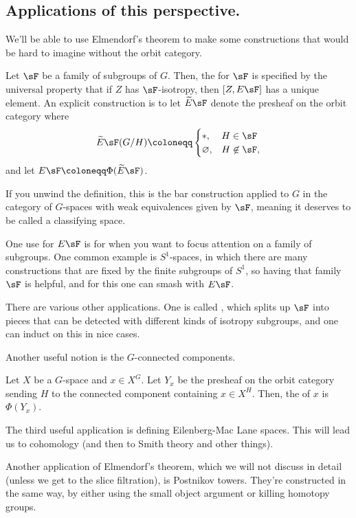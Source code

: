 \subsection*{Applications of this perspective.}
We'll be able to use Elmendorf's theorem to make some constructions that would be hard to imagine without the orbit
category.
\begin{defn}
Let $\sF$ be a family of subgroups of $G$. Then, the  for $\sF$
is specified by the universal property that if $Z$ has $\sF$-isotropy, then $[Z, E\sF]$ has a unique element. An
explicit construction is to let $\widetilde E\sF$ denote the presheaf on the orbit category where
\[\widetilde E\sF(G/H) \coloneqq
\begin{cases}
	*, &H\in\sF\\
	\varnothing, &H\not\in\sF,
\end{cases}\]
and let $E\sF\coloneqq \Phi(\widetilde E\sF)$.
\end{defn}
If you unwind the definition, this is the bar construction applied to $G$ in the category of $G$-spaces with weak
equivalences given by $\sF$, meaning it deserves to be called a classifying space.
\begin{rem}
One use for $E\sF$ is for when you want to focus attention on a family of subgroups. One common example is
$S^1$-spaces, in which there are many constructions that are fixed by the finite subgroups of $S^1$, so having that
family $\sF$ is helpful, and for this one can smash with $E\sF$.

There are various other applications. One is called , which splits up $\sF$ into pieces
that can be detected with different kinds of isotropy subgroups, and one can induct on this in nice cases.
\end{rem}

Another useful notion is the $G$-connected components.
\begin{defn}
Let $X$ be a $G$-space and $x\in X^G$. Let $Y_x$ be the presheaf on the orbit category sending $H$ to the connected
component containing $x\in X^H$. Then, the  of $x$ is $\Phi(Y_x)$.
\end{defn}
The third useful application is defining Eilenberg-Mac Lane spaces. This will lead us to cohomology (and then to
Smith theory and other things).
\begin{rem}
Another application of Elmendorf's theorem, which we will not discuss in detail (unless we get to the slice
filtration), is Postnikov towers. They're constructed in the same way, by either using the small object argument or
killing homotopy groups.
\end{rem}
